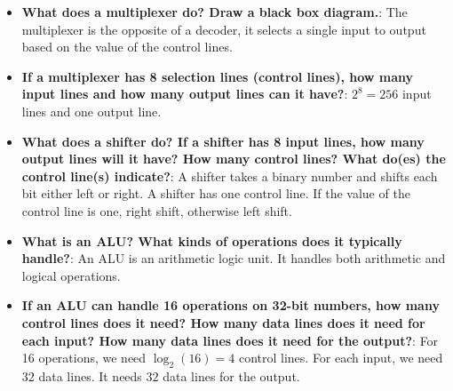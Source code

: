 \documentclass{report}
\begin{document}
\begin{itemize}
        \item \textbf{What does a multiplexer do? Draw a black box diagram.}:
            \bigbreak \noindent 
            The multiplexer is the opposite of a decoder, it selects a single input to output based on the value of the control lines.
        \item \textbf{If a multiplexer has 8 selection lines (control lines), how many input lines and how many output lines can it have?}:
            $2^{8} = 256$ input lines and one output line.
        \item \textbf{What does a shifter do? If a shifter has 8 input lines, how many output lines will it have? How many control lines? What do(es) the control line(s) indicate?}:
            A shifter takes a binary number and shifts each bit either left or right. A shifter has one control line. If the value of the control line is one, right shift, otherwise left shift.
        \item \textbf{What is an ALU? What kinds of operations does it typically handle?}:
            An ALU is an arithmetic logic unit. It handles both arithmetic and logical operations.
        \item \textbf{If an ALU can handle 16 operations on 32-bit numbers, how many control lines does it need? How many data lines does it need for each input? How many data lines does it need for the output?}:
            For 16 operations, we need $\log_2(16) = 4$ control lines. For each input, we need $32$ data lines. It needs $32$ data lines for the output.
    \end{itemize}
\end{document}

